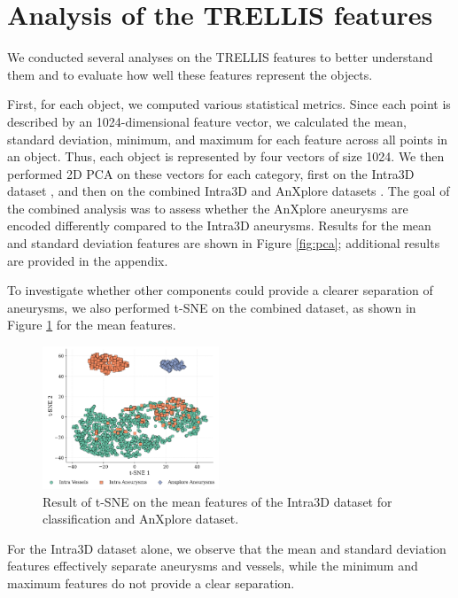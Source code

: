 \documentclass[%
 reprint,
 amsmath,amssymb,
 aps,
 floatfix,
 nofootinbib,
]{revtex4-2}
\begin{document}
\section{Analysis of the TRELLIS features} \label{FEATURES}

We conducted several analyses on the TRELLIS features to better understand them and to evaluate how well these features represent the objects.

First, for each object, we computed various statistical metrics. Since each point is described by an 1024-dimensional feature vector, we calculated the mean, standard deviation, minimum, and maximum for each feature across all points in an object. Thus, each object is represented by four vectors of size 1024. We then performed 2D PCA on these vectors for each category, first on the Intra3D dataset \citep{yang2020intra}, and then on the combined Intra3D and AnXplore datasets \citep{anxplore}. The goal of the combined analysis was to assess whether the AnXplore aneurysms are encoded differently compared to the Intra3D aneurysms. Results for the mean and standard deviation features are shown in Figure \ref{fig:pca}; additional results are provided in the appendix.

To investigate whether other components could provide a clearer separation of aneurysms, we also performed t-SNE on the combined dataset, as shown in Figure \ref{fig:tsne} for the mean features.

\begin{figure}[h]
  \centering
  \begin{flushleft}
    \includegraphics[width=0.47\textwidth]{t-sne_mean.png}
  \end{flushleft}  
  \caption{Result of t-SNE on the mean features of the Intra3D dataset for classification and AnXplore dataset.}
  \label{fig:tsne}
\end{figure}

For the Intra3D dataset alone, we observe that the mean and standard deviation features effectively separate aneurysms and vessels, while the minimum and maximum features do not provide a clear separation. 
\end{document}
